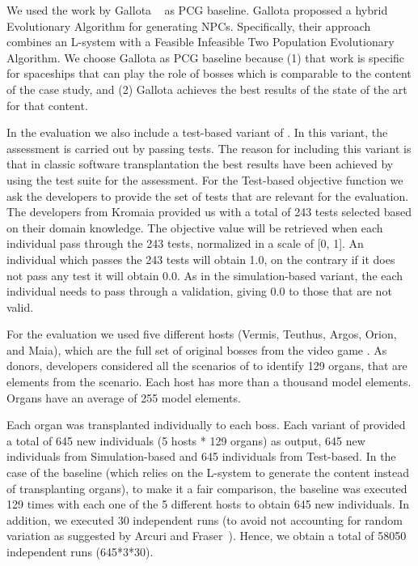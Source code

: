 We used the work by Gallota \etal~\cite{gallotta2022evolving} as PCG baseline. Gallota \etal propossed a hybrid Evolutionary Algorithm for generating NPCs. Specifically, their approach combines an L-system with a Feasible Infeasible Two Population Evolutionary Algorithm. We choose Gallota \etal as PCG baseline because (1) that work is specific for spaceships that can play the role of bosses which is comparable to the content of the case study, and (2) Gallota \etal achieves the best results of the state of the art for that content. 

In the evaluation we also include a test-based variant of \ApproachName{}. In this variant, the assessment is carried out by passing tests. The reason for including this variant is that in classic software transplantation the best results have been achieved by using the test suite for the assessment.
For the Test-based objective function we ask the developers to provide the set of tests that are relevant for the evaluation. The developers from Kromaia provided us with a total of 243 tests selected based on their domain knowledge. The objective value will be retrieved when each individual pass through the 243 tests, normalized in a scale of [0, 1]. An individual which passes the 243 tests will obtain 1.0, on the
contrary if it does not pass any test it will obtain 0.0. As in the simulation-based variant, the each individual needs to pass through a validation, giving 0.0 to those that are not valid.

For the evaluation we used five different hosts (Vermis, Teuthus, Argos, Orion, and Maia), which are the full set of original bosses from the video game \CaseStudy{}. As donors, \CaseStudy{} developers considered all the \CaseStudy{} scenarios of to identify 129 organs, that are elements from the scenario. Each host has more than a thousand model elements. Organs have an average of 255 model elements.

Each organ was transplanted individually to each boss. Each variant of \ApproachName{} provided a total of 645 new individuals (5 hosts * 129 organs) as output, 645 new individuals from Simulation-based and 645 individuals from Test-based. In the case of the baseline (which relies on the L-system to generate the content instead of transplanting organs), to make it a fair comparison, the baseline was executed 129 times with each one of the 5 different hosts to obtain 645 new individuals. In addition, we executed 30 independent runs (to avoid not accounting for random variation as suggested by Arcuri and Fraser~\cite{arcuri2013parameter}). Hence, we obtain a total of 58050 independent runs (645*3*30).

